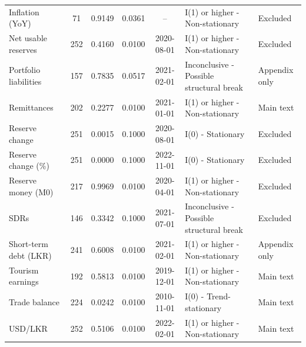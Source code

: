 \begin{longtable}{p{3.0cm}ccccp{5.0cm}p{1.9cm}}
Inflation (YoY) & 71 & 0.9149 & 0.0361 & -- & I(1) or higher - Non-stationary & Excluded \\
Net usable reserves & 252 & 0.4160 & 0.0100 & 2020-08-01 & I(1) or higher - Non-stationary & Excluded \\
Portfolio liabilities & 157 & 0.7835 & 0.0517 & 2021-02-01 & Inconclusive - Possible structural break & Appendix only \\
Remittances & 202 & 0.2277 & 0.0100 & 2021-01-01 & I(1) or higher - Non-stationary & Main text \\
Reserve change & 251 & 0.0015 & 0.1000 & 2020-08-01 & I(0) - Stationary & Excluded \\
Reserve change (\%) & 251 & 0.0000 & 0.1000 & 2022-11-01 & I(0) - Stationary & Excluded \\
Reserve money (M0) & 217 & 0.9969 & 0.0100 & 2020-04-01 & I(1) or higher - Non-stationary & Excluded \\
SDRs & 146 & 0.3342 & 0.1000 & 2021-07-01 & Inconclusive - Possible structural break & Excluded \\
Short-term debt (LKR) & 241 & 0.6008 & 0.0100 & 2021-02-01 & I(1) or higher - Non-stationary & Appendix only \\
Tourism earnings & 192 & 0.5813 & 0.0100 & 2019-12-01 & I(1) or higher - Non-stationary & Main text \\
Trade balance & 224 & 0.0242 & 0.0100 & 2010-11-01 & I(0) - Trend-stationary & Main text \\
USD/LKR & 252 & 0.5106 & 0.0100 & 2022-02-01 & I(1) or higher - Non-stationary & Main text \\
\end{longtable}